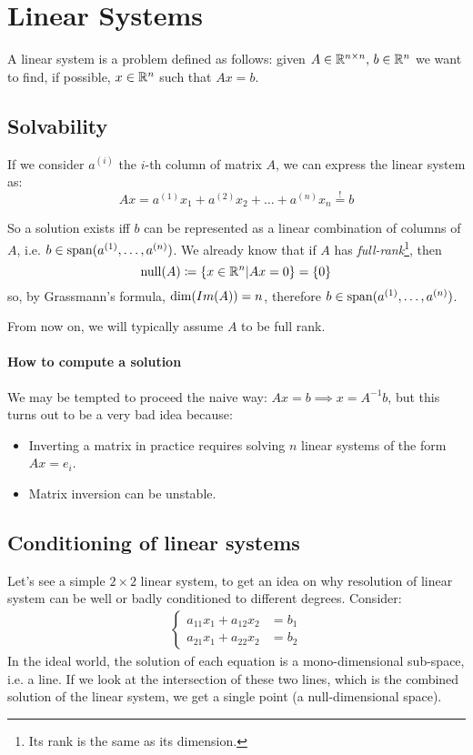 \section{Linear Systems}
A linear system is a problem defined as follows: given $A \in \mathbb{R}^{n \times n},\,b \in \mathbb{R}^n$ we want to find, if possible, $x \in \mathbb{R}^n$ such that $Ax = b$.

\subsection{Solvability}
If we consider $a^{(i)}$ the $i$-th column of matrix $A$, we can express the linear system as:
\begin{dmath*}
	Ax = a^{(1)}x_1 + a^{(2)}x_2 + \ldots + a^{(n)}x_n \stackrel{!}{=} b
\end{dmath*}

So a solution exists iff $b$ can be represented as a linear combination of columns of $A$, i.e. $b \in \operatorname{span}(a^{(1)},\ldots,a^{(n)})$.
We already know that if $A$ has \emph{full-rank}\footnote{Its rank is the same as its dimension.}, then
\begin{equation*}
	\operatorname{null}(A) \coloneqq \{ x \in \mathbb{R}^n | Ax = 0 \} = \{0\}
\end{equation*}
so, by Grassmann's formula, $\operatorname{dim}(Im(A)) = n$, therefore $b \in \operatorname{span}(a^{(1)},\ldots,a^{(n)})$.

From now on, we will typically assume $A$ to be full rank.

\paragraph{How to compute a solution}
We may be tempted to proceed the naive way: $Ax = b \implies x = A^{-1}b$, but this turns out to be a very bad idea because:
\begin{itemize}
	\item Inverting a matrix in practice requires solving $n$ linear systems of the form $Ax = e_i$.
	\item Matrix inversion can be unstable.
\end{itemize}

\subsection{Conditioning of linear systems}
Let's see a simple $2 \times 2$ linear system, to get an idea on why resolution of linear system can be well or badly conditioned to different degrees. Consider:
\begin{align*}
	\begin{cases}
		a_{11} x_1 + a_{12} x_2 &= b_1\\
		a_{21} x_1 + a_{22} x_2 &= b_2
	\end{cases}
\end{align*}
In the ideal world, the solution of each equation is a mono-dimensional sub-space, i.e. a line. If we look at the intersection of these two lines, which is the combined solution of the linear system, we get a single point (a null-dimensional space).

